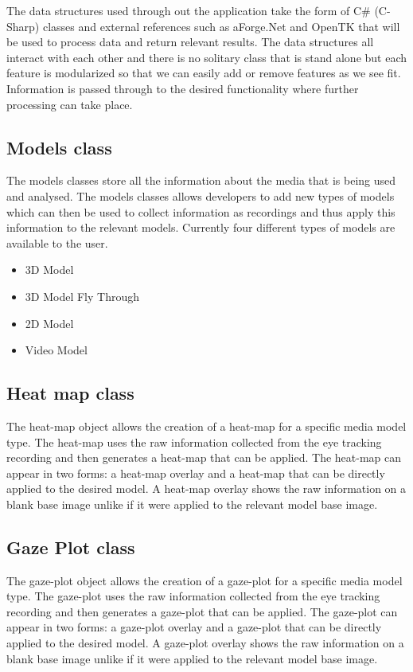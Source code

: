 The data structures used through out the application take the form of C\# (C-Sharp) classes and external references such as aForge.Net and OpenTK that will be used to process data and return relevant results. The data structures all interact with each other and there is no solitary class that is stand alone but each feature is modularized so that we can easily add or remove features as we see fit. Information is passed through to the desired functionality where further processing can take place.

\subsection{Models class}
The models classes store all the information about the media that is being used and analysed. The models classes allows developers to add new types of models which can then be used to collect information as recordings and thus apply this information to the relevant models. Currently four different types of models are available to the user.
\begin{itemize}
\item 3D Model
\item 3D Model Fly Through
\item 2D Model
\item Video Model
\end{itemize}

\subsection{Heat map class}
The heat-map object allows the creation of a heat-map for a specific media model type. The heat-map uses the raw information collected from the eye tracking recording and then generates a heat-map that can be applied. The heat-map can appear in two forms: a heat-map overlay and a heat-map that can be directly applied to the desired model. A heat-map overlay shows the raw information on a blank base image unlike if it were applied to the relevant model base image.

\subsection{Gaze Plot class}
The gaze-plot object allows the creation of a gaze-plot for a specific media model type. The gaze-plot uses the raw information collected from the eye tracking recording and then generates a gaze-plot that can be applied. The gaze-plot can appear in two forms: a gaze-plot overlay and a gaze-plot that can be directly applied to the desired model. A gaze-plot overlay shows the raw information on a blank base image unlike if it were applied to the relevant model base image.

